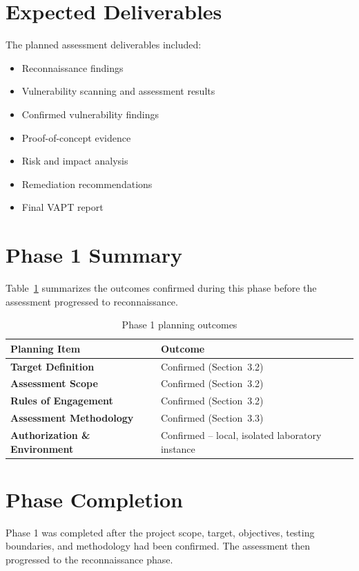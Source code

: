 \section{Expected Deliverables}

The planned assessment deliverables included:

\begin{itemize}
    \item Reconnaissance findings
    \item Vulnerability scanning and assessment results
    \item Confirmed vulnerability findings
    \item Proof-of-concept evidence
    \item Risk and impact analysis
    \item Remediation recommendations
    \item Final VAPT report
\end{itemize}

\section{Phase 1 Summary}

Table~\ref{tab:phase1-summary} summarizes the outcomes confirmed
during this phase before the assessment progressed to
reconnaissance.

\begin{table}[H]
\centering
\begin{tabularx}{\textwidth}{>{\bfseries}p{} X}
\toprule
Planning Item & Outcome \\
\midrule
Target Definition & Confirmed (Section~3.2) \\
Assessment Scope & Confirmed (Section~3.2) \\
Rules of Engagement & Confirmed (Section~3.2) \\
Assessment Methodology & Confirmed (Section~3.3) \\
Authorization \& Environment & Confirmed -- local, isolated
laboratory instance \\
\bottomrule
\end{tabularx}
\caption{Phase 1 planning outcomes}
\label{tab:phase1-summary}
\end{table}

\section{Phase Completion}

Phase 1 was completed after the project scope, target, objectives,
testing boundaries, and methodology had been confirmed. The
assessment then progressed to the reconnaissance phase.